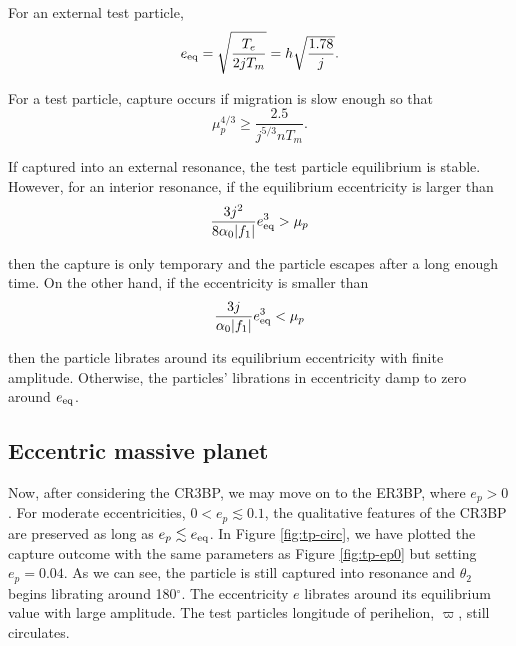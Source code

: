 \documentclass[usenatbib,onecolumn]{mnras}
\DeclarePairedDelimiter{\abs}{|}{|}
\begin{document}
\noindent
For an external test particle,
\begin{equation}
\label{eq:eeqext}
  e_{\rm eq} = \sqrt{\frac{T_e}{2jT_m}} = h\sqrt{\frac{1.78}{j}}.
\end{equation}

For a test particle, capture occurs if migration is slow enough so that
\citep{goldreich_overstable_2014}
\begin{equation}
\mu_p^{4/3} \geq \frac{2.5}{j^{5/3}n T_m}.
\end{equation}

\noindent
If captured into an external resonance, the test particle equilibrium
is stable. However, for an interior resonance, if the equilibrium
eccentricity is larger than
\begin{equation}
  \frac{3j^2}{8\alpha_0 \abs{f_1}}e_{\rm eq}^3 > \mu_p
\end{equation}

\noindent
then the capture is only temporary and the particle escapes after a
long enough time. On the other hand, if the eccentricity is smaller
than
\begin{equation}
  \frac{3j}{\alpha_0 \abs{f_1}}e_{\rm eq}^3 < \mu_p
\end{equation}

\noindent
then the particle librates around its equilibrium eccentricity with
finite amplitude. Otherwise, the particles' librations in eccentricity
damp to zero around \(e_{\rm eq}\).


\subsection{Eccentric massive planet}
\label{sec:orgdac0e5f}
Now, after considering the
CR3BP, we may move on to the ER3BP, where \(e_p>0\).  For moderate
eccentricities, \(0<e_p\lesssim 0.1\), the qualitative features of the
CR3BP are preserved as long as \(e_p \lesssim e_{\rm eq}\). In Figure
\ref{fig:tp-circ}, we have plotted the capture outcome with the same
parameters as Figure \ref{fig:tp-ep0} but setting \(e_p = 0.04\). As we
can see, the particle is still captured into resonance and \(\theta_2\)
begins librating around 180\(^\circ\). The eccentricity \(e\) librates
around its equilibrium value with large amplitude. The test particles
longitude of perihelion, \(\varpi\), still circulates.
\end{document}
